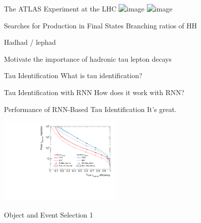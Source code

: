 \documentclass[11pt, xcolor={dvipsnames}, aspectratio=169]{beamer}
\begin{document}

\begin{frame}{The ATLAS Experiment at the LHC}
  \centering
  \includegraphics<1>[scale=0.95]{lhc_atlas/lhc_atlas_1}
  \includegraphics<2>[scale=0.95]{lhc_atlas/lhc_atlas_2}
\end{frame}


\begin{frame}{Searches for \HH Production in \bbtautau Final States}
  Branching ratios of HH

  Hadhad / lephad

  \alert{Motivate} the importance of hadronic tau lepton decays
\end{frame}


\begin{frame}{Tau Identification}
  What is tau identification?
\end{frame}


\begin{frame}{Tau Identification with RNN}
  How does it work with RNN?
\end{frame}


\begin{frame}{Performance of RNN-Based Tau Identification}
  It's great.

  \includegraphics[width=0.45\textwidth]{tauid/roc_incl_witherrors}
\end{frame}


\begin{frame}{Object and Event Selection 1}
\end{frame}
\end{document}
